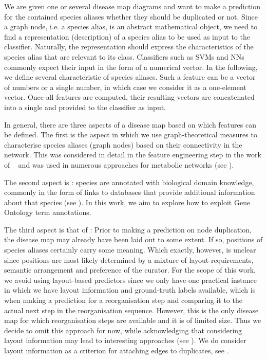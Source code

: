 \documentclass[
	fontsize=10pt, %
	twoside=true, %
	secnumdepth=1, %
  toc=indentunnumbered %
]{kaobook}
\begin{document}
We are given one or several disease map diagrams and want to make a prediction
for the contained species aliases whether they should be duplicated or not.
Since a graph node, i.e. a species alias, is an abstract mathematical object, we
need to find a representation (description) of a species alias to be used as
input to the classifier. Naturally, the representation should express the
characteristics of the species alias that are relevant to its class.
Classifiers such as SVMs and NNs commonly expect their input in the form of a
numerical vector.
%
In the following, we define several characteristic  of
species aliases. Such a feature can be a vector of numbers or a single
number, in which case we consider it as a one-element vector. Once all
features are computed, their resulting vectors are concatenated into a
single  and provided to the classifier as input.

In general, there are three aspects of a disease map based on which features
can be defined. The first is the  aspect in which we use
graph-theoretical measures to characterise species aliases (graph nodes) based
on their connectivity in the network. This was considered in detail in the
feature engineering step in the work of
\citeauthor{nielsen_MachineLearningSupport_2019}~\cite{nielsen_MachineLearningSupport_2019}
and was used in numerous
approaches for metabolic networks (see ).

The second aspect is : species are annotated with biological
domain knowledge, commonly in the form of links to databases that provide
additional information about that species (see ). In
this work, we aim to explore how to exploit Gene Ontology term annotations.

The third aspect is that of : Prior to making a prediction on node
duplication, the disease map may already have been laid out to some extent.
If so, positions of species aliases certainly carry some meaning. Which exactly,
however, is unclear since positions are most likely determined by a mixture of
layout requirements, semantic arrangement and preference of the curator.
%
For the scope of this work, we avoid using layout-based predictors
since we only have one practical instance in which we have layout information
and ground-truth labels available, which is when making a prediction for a
 reorganisation step and comparing it to the actual next
step in the reorganisation sequence. However, this is the only disease map for
which reorganisation steps are available and it is of limited size. Thus we
decide to omit this approach for now, while acknowledging that considering
layout information may lead to interesting approaches (see
). We do consider layout information as a
criterion for attaching edges to duplicates, see . 
\end{document}
